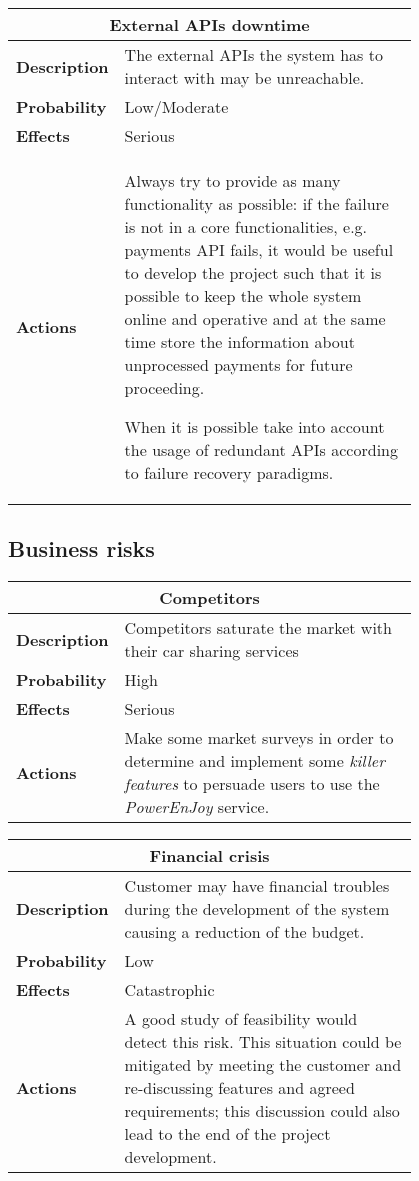 \begin{longtable}{lp{0.8\linewidth}}
\multicolumn{2}{c}{\textbf{External APIs downtime}}\\
\toprule
\textbf{Description}& The external APIs the system has to interact with may be unreachable.\\
\midrule
\textbf{Probability}&Low/Moderate\\
\midrule
\textbf{Effects}&Serious\\
\midrule
\textbf{Actions}& Always try to provide as many functionality as possible: if the failure is not in a core functionalities, e.g. payments API fails, it would be useful to develop the project such that it is possible to keep the whole system online and operative and at the same time store the information about unprocessed payments for future proceeding.

When it is possible take into account the usage of redundant APIs according to failure recovery paradigms. \\
\bottomrule
\end{longtable}

\subsection{Business risks}
\begin{longtable}{lp{0.8\linewidth}}
\multicolumn{2}{c}{\textbf{Competitors}}\\
\toprule
\textbf{Description}&Competitors saturate the market with their car sharing services\\
\midrule
\textbf{Probability}&High\\
\midrule
\textbf{Effects}&Serious\\
\midrule
\textbf{Actions}&Make some market surveys in order to determine and implement some \emph{killer features} to persuade users to use the \emph{PowerEnJoy} service.\\
\bottomrule
\end{longtable}

\begin{longtable}{lp{0.8\linewidth}}
\multicolumn{2}{c}{\textbf{Financial crisis}}\\
\toprule
\textbf{Description}&Customer may have financial troubles during the development of the system causing a reduction of the budget.\\
\midrule
\textbf{Probability}&Low\\
\midrule
\textbf{Effects}&Catastrophic\\
\midrule
\textbf{Actions}& A good study of feasibility would detect this risk.  This situation could be mitigated by meeting the customer and re-discussing features and agreed requirements; this discussion could also lead to the end of the project development. \\
\bottomrule
\end{longtable}

